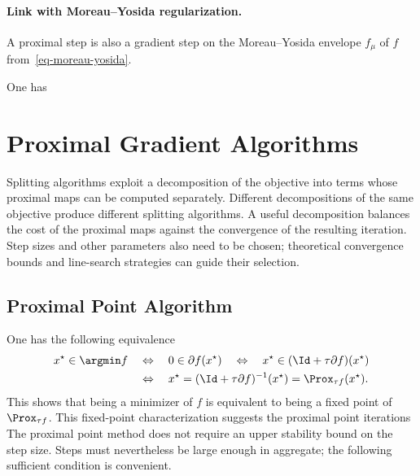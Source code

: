 \paragraph{Link with Moreau--Yosida regularization.}

A proximal step is also a gradient step on the Moreau--Yosida envelope $f_\mu$ of $f$ from~\eqref{eq-moreau-yosida}.

\begin{prop}
	One has
\end{prop}


\section{Proximal Gradient Algorithms}

Splitting algorithms exploit a decomposition of the objective into terms whose proximal maps can be computed separately.
%
Different decompositions of the same objective produce different splitting algorithms. A useful decomposition balances the cost of the proximal maps against the convergence of the resulting iteration.
%
Step sizes and other parameters also need to be chosen; theoretical convergence bounds and line-search strategies can guide their selection.

\subsection{Proximal Point Algorithm}

One has the following equivalence 
\begin{align}\label{eq-proxpoint-fix}
	x^\star \in \argmin f
	&\quad\Leftrightarrow\quad
	0 \in \partial f(x^\star)
	\quad\Leftrightarrow\quad
	x^\star \in (\Id+\tau \partial f)(x^\star) \\
	&\quad\Leftrightarrow\quad
	x^\star = (\Id+\tau \partial f)^{-1}(x^\star) = \Prox_{\tau f}(x^\star).
\end{align}
This shows that being a minimizer of $f$ is equivalent to being a fixed point of $\Prox_{\tau f}$.
%
This fixed-point characterization suggests the proximal point iterations
The proximal point method does not require an upper stability bound on the step size. Steps must nevertheless be large enough in aggregate; the following sufficient condition is convenient.

